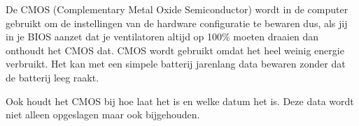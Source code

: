 De CMOS (Complementary Metal Oxide Semiconductor) wordt in de computer gebruikt om de instellingen van de hardware configuratie te bewaren dus, als jij in je BIOS aanzet dat je ventilatoren altijd op 100\% moeten draaien dan onthoudt het CMOS dat. CMOS wordt gebruikt omdat het heel weinig energie verbruikt. Het kan met een simpele batterij jarenlang data bewaren zonder dat de batterij leeg raakt.

Ook houdt het CMOS bij hoe laat het is en welke datum het is. Deze data wordt niet alleen opgeslagen maar ook bijgehouden.

